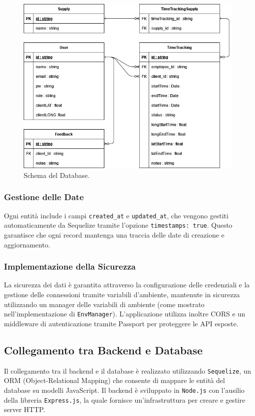 \documentclass[twoside]{supsistudent}
\begin{document}
\begin{figure}[ht]
  \centering
  \includegraphics[scale=0.6]{./images/dbschema.png}
  \caption{Schema del Database.}
  \label{fig:databaseschema}
\end{figure}

\subsubsection{Gestione delle Date}
Ogni entità include i campi \texttt{created\_at} e \texttt{updated\_at}, che vengono gestiti automaticamente da Sequelize tramite l'opzione \texttt{timestamps: true}. Questo garantisce che ogni record mantenga una traccia delle date di creazione e aggiornamento.

\subsubsection{Implementazione della Sicurezza}
La sicurezza dei dati è garantita attraverso la configurazione delle credenziali e la gestione delle connessioni tramite variabili d'ambiente, mantenute in sicurezza utilizzando un manager delle variabili di ambiente (come mostrato nell'implementazione di \texttt{EnvManager}). L'applicazione utilizza inoltre CORS e un middleware di autenticazione tramite Passport per proteggere le API esposte.

\subsection{Collegamento tra Backend e Database}
Il collegamento tra il backend e il database è realizzato utilizzando \texttt{Sequelize}, un ORM (Object-Relational Mapping) che consente di mappare le entità del database su modelli JavaScript. Il backend è sviluppato in \texttt{Node.js} con l'ausilio della libreria \texttt{Express.js}, la quale fornisce un'infrastruttura per creare e gestire server HTTP.
\end{document}
